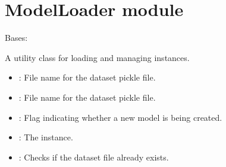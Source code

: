\documentclass[letterpaper,10pt,english]{sphinxmanual}
\begin{document}
\sphinxstepscope


\section{ModelLoader module}
\label{\detokenize{ModelLoader:module-ModelLoader}}\label{\detokenize{ModelLoader:modelloader-module}}\label{\detokenize{ModelLoader::doc}}

\begin{fulllineitems}
\label{\detokenize{ModelLoader:ModelLoader.ModelLoader}}
\pysigstartsignatures
{}
\pysigstopsignatures
\sphinxAtStartPar
Bases: 

\sphinxAtStartPar
A utility class for loading and managing  instances.
\begin{description}
\begin{itemize}
\item {} 
\sphinxAtStartPar
{}: File name for the dataset pickle file.

\end{itemize}

\begin{itemize}
\item {} 
\sphinxAtStartPar
{}: File name for the dataset pickle file.

\item {} 
\sphinxAtStartPar
{}: Flag indicating whether a new model is being created.

\item {} 
\sphinxAtStartPar
{}: The  instance.

\end{itemize}

\begin{itemize}
\item {} 
\sphinxAtStartPar
{}: Checks if the dataset file already exists.


\end{itemize}
\end{description}
\end{fulllineitems}
\end{document}
